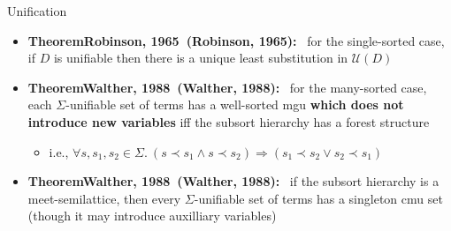 \documentclass[pdf,fyma2]{prosper} %
\makeatletter
\newcommand{\hilighten}[1]{{\color{fymablue}#1}}
\newcommand{\UNIFIERS}{\ensuremath{\mathcal{U}\!}}
\renewcommand{\emph}[1]{\hilighten{\textbf{#1}}}
\newcommand{\thm}[1][]{%
    \def\thm@tmp{#1}%
    \textbf{Theorem\ifx\thm@tmp\@empty\relax\else\ (\thm@tmp)\fi:}\ }
\makeatother
\begin{document}
\begin{slide}{Unification}
	\vspace{1em}
	\begin{itemize}
	\item \thm[Robinson, 1965] for the single-sorted case, if $D$ is unifiable then there is a unique least substitution in $\UNIFIERS(D)$
	\vspace{1em}
	\item \thm[Walther, 1988] for the many-sorted case, each $\Sigma$-unifiable set of terms has a well-sorted mgu \emph{which does not introduce new variables} iff the subsort hierarchy has a forest structure
        \begin{itemize}
        \item i.e., $\forall s, s_1, s_2 \in \Sigma.~ (s \prec s_1 \land s\prec s_2) \Rightarrow (s_1\prec s_2 \lor s_2\prec s_1)$
        \end{itemize}
	\vspace{1em}
	\item \thm[Walther, 1988] if the subsort hierarchy is a meet-semilattice, then every $\Sigma$-unifiable set of terms has a singleton cmu set (though it may introduce auxilliary variables)
    \end{itemize}
\end{slide}
\end{document}
